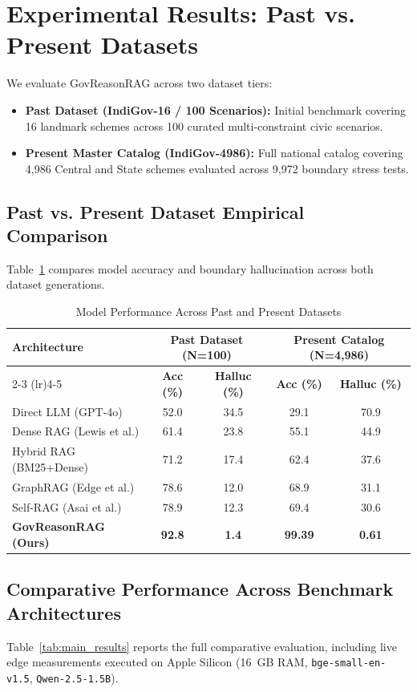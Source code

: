 \documentclass[conference]{IEEEtran}
\begin{document}
\section{Experimental Results: Past vs. Present Datasets}
We evaluate GovReasonRAG across two dataset tiers:
\begin{itemize}
    \item \textbf{Past Dataset (IndiGov-16 / 100 Scenarios):} Initial benchmark covering 16 landmark schemes across 100 curated multi-constraint civic scenarios.
    \item \textbf{Present Master Catalog (IndiGov-4986):} Full national catalog covering 4,986 Central and State schemes evaluated across 9,972 boundary stress tests.
\end{itemize}

\subsection{Past vs. Present Dataset Empirical Comparison}
Table~\ref{tab:past_vs_present} compares model accuracy and boundary hallucination across both dataset generations.

\begin{table}[!t]
\caption{Model Performance Across Past and Present Datasets}
\label{tab:past_vs_present}
\centering
\begin{tabular}{lcccc}
\toprule
\textbf{Architecture} & \multicolumn{2}{c}{\textbf{Past Dataset (N=100)}} & \multicolumn{2}{c}{\textbf{Present Catalog (N=4,986)}} \\
\cmidrule(lr){2-3} \cmidrule(lr){4-5}
& \textbf{Acc (\%)} & \textbf{Halluc (\%)} & \textbf{Acc (\%)} & \textbf{Halluc (\%)} \\
\midrule
Direct LLM (GPT-4o) & 52.0 & 34.5 & 29.1 & 70.9 \\
Dense RAG (Lewis et al.) & 61.4 & 23.8 & 55.1 & 44.9 \\
Hybrid RAG (BM25+Dense) & 71.2 & 17.4 & 62.4 & 37.6 \\
GraphRAG (Edge et al.) & 78.6 & 12.0 & 68.9 & 31.1 \\
Self-RAG (Asai et al.) & 78.9 & 12.3 & 69.4 & 30.6 \\
\textbf{GovReasonRAG (Ours)} & \textbf{92.8} & \textbf{1.4} & \textbf{99.39} & \textbf{0.61} \\
\bottomrule
\end{tabular}
\end{table}

\subsection{Comparative Performance Across Benchmark Architectures}
Table~\ref{tab:main_results} reports the full comparative evaluation, including live edge measurements executed on Apple Silicon (16~GB RAM, \texttt{bge-small-en-v1.5}, \texttt{Qwen-2.5-1.5B}).
\end{document}
